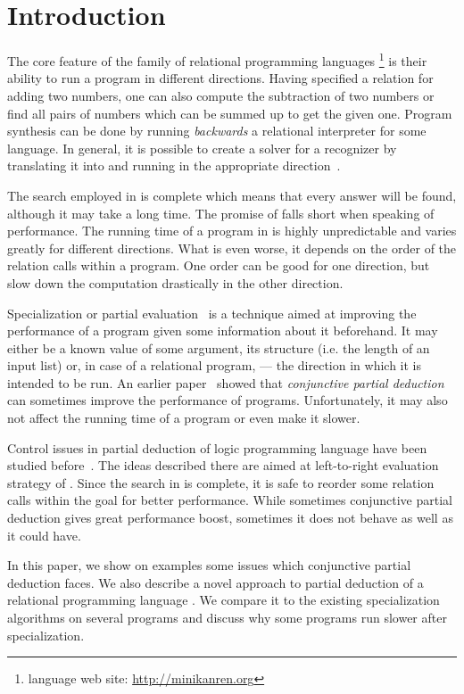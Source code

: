 \section{Introduction}

The core feature of the family of relational programming languages \mk{}\footnote{\mk{} language web site: \url{http://minikanren.org}} is their ability to run a program in different directions.
Having specified a relation for adding two numbers, one can also compute the subtraction of two numbers or find all pairs of numbers which can be summed up to get the given one.
Program synthesis can be done by running \emph{backwards} a relational interpreter for some language.
In general, it is possible to create a solver for a recognizer by translating it into \mk{} and running in the appropriate direction~\cite{lozov2019relational}.

The search employed in \mk{} is complete which means that every answer will be found, although it may take a long time.
The promise of \mk{} falls short when speaking of performance.
The running time of a program in \mk{} is highly unpredictable and varies greatly for different directions.
What is even worse, it depends on the order of the relation calls within a program.
One order can be good for one direction, but slow down the computation drastically in the other direction.

Specialization or partial evaluation~\cite{jonesbook} is a technique aimed at improving the performance of a program given some information about it beforehand.
It may either be a known value of some argument, its structure (i.e. the length of an input list) or, in case of a relational program, --- the direction in which it is intended to be run.
An earlier paper~\cite{lozov2019relational} showed that \emph{conjunctive partial deduction}~\cite{de1999conjunctive} can sometimes improve the performance of \mk{} programs.
Unfortunately, it may also not affect the running time of a program or even make it slower.

Control issues in partial deduction of logic programming language \pro{} have been studied before~\cite{leuschel2002logic}.
The ideas described there are aimed at left-to-right evaluation strategy of \pro{}.
Since the search in \mk{} is complete, it is safe to reorder some relation calls within the goal for better performance.
While sometimes conjunctive partial deduction gives great performance boost, sometimes it does not behave as well as it could have.

In this paper, we show on examples some issues which conjunctive partial deduction faces.
We also describe a novel approach to partial deduction of a relational programming language \mk{}.
We compare it to the existing specialization algorithms on several programs and discuss why some \mk{} programs run slower after specialization.
